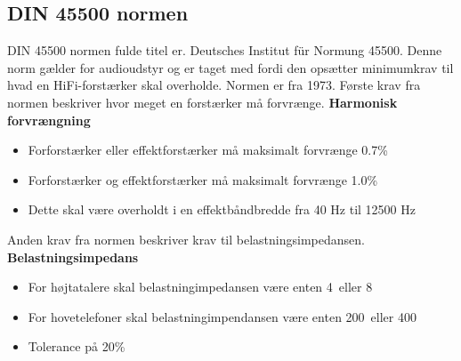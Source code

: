 \subsection*{DIN 45500 normen}
\label{DIN45500}
DIN 45500 normen fulde titel er. Deutsches Institut f\"{u}r Normung 45500. Denne norm gælder for audioudstyr og er taget med fordi den opsætter minimumkrav til hvad en HiFi-forstærker skal overholde. Normen er fra 1973. \cite{DIN45500}%
\newline
\newline
Første krav fra normen beskriver hvor meget en forstærker må forvrænge.
\newline
\newline
\textbf{Harmonisk forvrængning}
\begin{itemize}
\item Forforstærker eller effektforstærker må maksimalt forvrænge 0.7\%
\item Forforstærker og effektforstærker må maksimalt forvrænge 1.0\%
\item Dette skal være overholdt i en effektbåndbredde fra 40 Hz til 12500 Hz
\end{itemize}
Anden krav fra normen beskriver krav til belastningsimpedansen.
\newline 
\newline
\textbf{Belastningsimpedans}
\begin{itemize}
\item For højtatalere skal belastningimpedansen være enten 4\ohm~eller 8\ohm
\item For hovetelefoner skal belastningimpendansen være enten 200\ohm~eller 400\ohm
\item Tolerance på 20\%
\end{itemize}